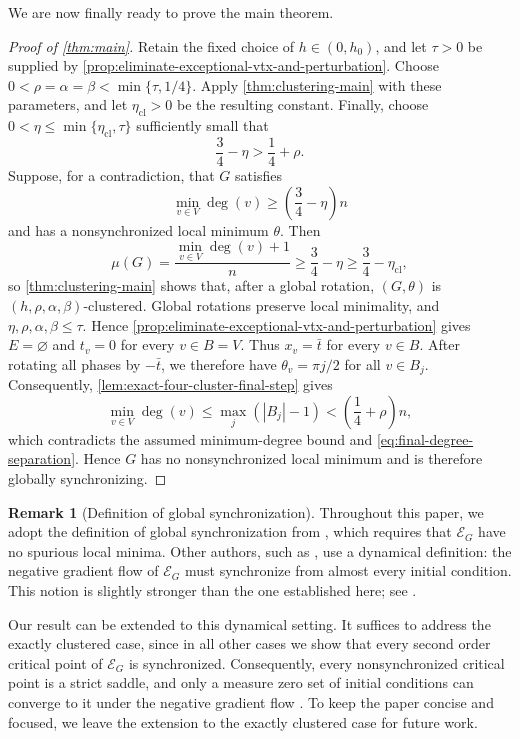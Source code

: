 \documentclass[reqno,11pt]{amsart}
\theoremstyle{definition}
\newtheorem{remark}{Remark}
\newcommand{\abs}[1]{\left\lvert #1\right\rvert}
\newcommand{\paren}[1]{\left(#1\right)}
\begin{document}
We are now finally ready to prove the main theorem.
\begin{proof}[Proof of \cref{thm:main}]
Retain the fixed choice of $h\in(0,h_0)$, and let $\tau>0$ be supplied by
\cref{prop:eliminate-exceptional-vtx-and-perturbation}.  Choose $ 0<\rho=\alpha=\beta<\min\{\tau,1/4\}.$ Apply \cref{thm:clustering-main} with these parameters, and let
$\eta_{\mathrm{cl}}>0$ be the resulting constant.  Finally, choose
$0<\eta\le\min\{\eta_{\mathrm{cl}},\tau\}$ sufficiently small that
\begin{equation}\label{eq:final-degree-separation}
    \frac34-\eta>\frac14+\rho.
\end{equation}
Suppose, for a contradiction, that $G$ satisfies
\[
    \min_{v\in V}\deg(v)\ge\paren{\frac34-\eta}n
\]
and has a nonsynchronized local minimum $\theta$.  Then
\[
    \mu(G)=\frac{\min_{v\in V}\deg(v)+1}{n}
    \ge\frac34-\eta\ge\frac34-\eta_{\mathrm{cl}},
\]
so \cref{thm:clustering-main} shows that, after a global rotation,
$(G,\theta)$ is $(h,\rho,\alpha,\beta)$-clustered.  Global rotations
preserve local minimality, and $\eta,\rho,\alpha,\beta\le\tau$.  Hence
\cref{prop:eliminate-exceptional-vtx-and-perturbation} gives
$E=\varnothing$ and $t_v=0$ for every $v\in B=V$.  Thus
$x_v=\bar t$ for every $v\in B$.  After rotating all phases by
$-\bar t$, we therefore have $\theta_v={\pi j}/{2}$ for all $v \in B_j.$ Consequently,
\cref{lem:exact-four-cluster-final-step} gives
\[
    \min_{v \in V} \deg(v)\le\max_j\paren{\abs{B_j}-1}
    <\paren{\frac14+\rho}n,
\]
which contradicts the assumed minimum-degree bound and
\eqref{eq:final-degree-separation}.  Hence $G$ has no nonsynchronized
local minimum and is therefore globally synchronizing.
\end{proof}
\begin{remark}[Definition of global synchronization]
    \label{rem:final-remark}
    Throughout this paper, we adopt the definition of global synchronization from \cite[Conjecture~5]{randomstrasse-25}, which requires that $\mathcal{E}_G$ have no spurious local minima. Other authors, such as \cite{bandeira-expanders}, use a dynamical definition: the negative gradient flow of $\mathcal{E}_G$ must synchronize from almost every initial condition. This notion is slightly stronger than the one established here; see \cite[Definition~1.1 and the subsequent discussion]{bandeira-expanders}.

    Our result can be extended to this dynamical setting. It suffices to address the exactly clustered case, since in all other cases we show that every second order critical point of $\mathcal{E}_G$ is synchronized. Consequently, every nonsynchronized critical point is a strict saddle, and only a measure zero set of initial conditions can converge to it under the negative gradient flow \cite{bandeira-expanders}. To keep the paper concise and focused, we leave the extension to the exactly clustered case for future work.
\end{remark}



\end{document}
